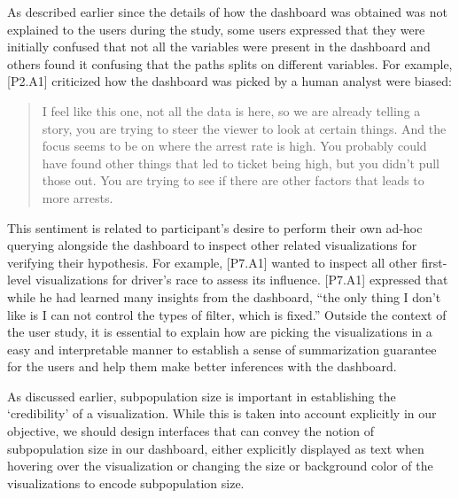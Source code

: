 As described earlier since the details of how the dashboard was obtained was not explained to the users during the study, some users expressed that they were initially confused that not all the variables were present in the dashboard and others found it confusing that the paths splits on different variables. For example, [P2.A1] criticized how the dashboard was picked by a human analyst were biased: 
\begin{quote}
I feel like this one, not all the data is here, so we are already telling a story, you are trying to steer the viewer to look at certain things. And the focus seems to be on where the arrest rate is high. You probably could have found other things that led to ticket being high, but you didn’t pull those out. You are trying to see if there are other factors that leads to more arrests.
\end{quote}
\par This sentiment is related to participant's desire to perform their own ad-hoc querying alongside the dashboard to inspect other related visualizations for verifying their hypothesis. For example, [P7.A1] wanted to inspect all other first-level visualizations for driver's race to assess its influence. [P7.A1] expressed that while he had learned many insights from the dashboard, ``the only thing I don't like is I can not control the types of filter, which is fixed.'' Outside the context of the user study, it is essential to explain how \system are picking the visualizations in a easy and interpretable manner to establish a sense of summarization guarantee for the users and help them make better inferences with the dashboard. 
\par As discussed earlier, subpopulation size is important in establishing the `credibility' of a visualization. While this is taken into account explicitly in our objective, we should design interfaces that can convey the notion of subpopulation size in our dashboard, either explicitly displayed as text when hovering over the visualization or changing the size or background color of the visualizations to encode subpopulation size.
